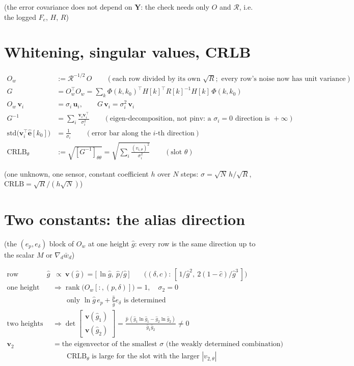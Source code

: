 \documentclass[11pt,a4paper,fontset=none]{ctexart}
\newcommand{\bw}{\bar{w}}
\newcommand{\gh}{\hat{g}}
\newcommand{\ph}{\hat{p}}
\newcommand{\dl}{\delta}
\newcommand{\Phik}{\Phi(k,k_0)}
\begin{document}
(the error covariance does not depend on $\mathbf{Y}$: the check needs only $O$ and $\mathcal{R}$, i.e. the logged $F_e$, $H$, $R$)

\section{Whitening, singular values, CRLB}

\begin{align*}
O_w &:= \mathcal{R}^{-1/2}\,O \qquad(\text{each row divided by its own } \sqrt{R}; \text{ every row's noise now has unit variance}) \\
G   &= O_w^{\top}O_w = \sum_{k}\Phik^{\top}H[k]^{\top}R[k]^{-1}H[k]\,\Phik \\[4pt]
O_w\,\mathbf{v}_i &= \sigma_i\,\mathbf{u}_i, \qquad G\,\mathbf{v}_i = \sigma_i^{2}\,\mathbf{v}_i \\
G^{-1} &= \sum_i \frac{\mathbf{v}_i\mathbf{v}_i^{\top}}{\sigma_i^{2}} \qquad(\text{eigen-decomposition, not pinv: a } \sigma_i = 0 \text{ direction is } +\infty) \\[4pt]
\mathrm{std}\bigl(\mathbf{v}_i^{\top}\hat{\mathbf{e}}[k_0]\bigr) &= \frac{1}{\sigma_i} \qquad(\text{error bar along the } i\text{-th direction}) \\
\mathrm{CRLB}_\theta &:= \sqrt{[G^{-1}]_{\theta\theta}} = \sqrt{\sum_i \frac{(v_{i,\theta})^{2}}{\sigma_i^{2}}} \qquad(\text{slot } \theta)
\end{align*}

(one unknown, one sensor, constant coefficient $h$ over $N$ steps: $\sigma = \sqrt{N}\,h/\sqrt{R}$, $\mathrm{CRLB} = \sqrt{R}/(h\sqrt{N})$)

\section{Two constants: the alias direction}

(the $(e_p, e_{\dl})$ block of $O_w$ at one height $\gh$: every row is the same direction up to the scalar $M$ or $\nabla_d\bw_d$)

\begin{align*}
\text{row direction at } \gh &\ \propto\ \mathbf{v}(\gh) = \bigl[\,\ln\gh,\ \ph/\gh\,\bigr]
\qquad \bigl((\dl, c)\text{: } [\,1/\gh^{2},\ 2(1-\hat c)/\gh^{3}\,]\bigr) \\
\text{one height only} &\Rightarrow \operatorname{rank}\bigl(O_w[:, (p,\dl)]\bigr) = 1,\quad \sigma_2 = 0 \\
                       &\qquad \text{only } \ln\gh\,e_p + \tfrac{\ph}{\gh}e_{\dl} \text{ is determined} \\
\text{two heights} &\Rightarrow \det\begin{bmatrix}\mathbf{v}(\gh_1)\\ \mathbf{v}(\gh_2)\end{bmatrix}
   = \frac{\ph\,(\gh_1\ln\gh_1 - \gh_2\ln\gh_2)}{\gh_1\gh_2} \ne 0 \\
\mathbf{v}_2 &= \text{the eigenvector of the smallest } \sigma \text{ (the weakly determined combination)} \\
   &\qquad \mathrm{CRLB}_\theta \text{ is large for the slot with the larger } |v_{2,\theta}|
\end{align*}
\end{document}
